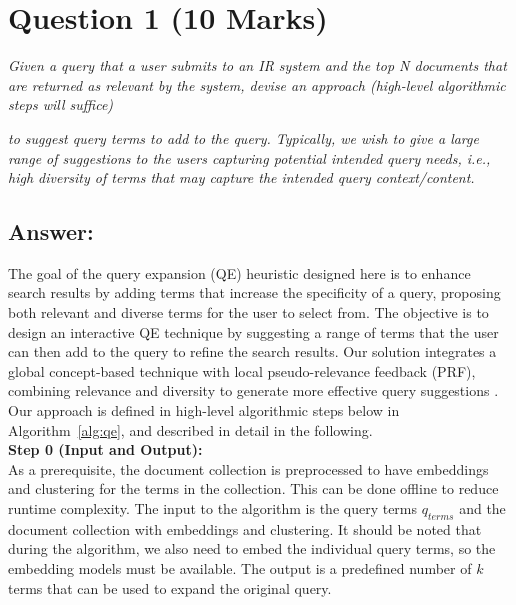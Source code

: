 \setcounter{page}{1}
\pagestyle{fancy}
\fancyhead[L]{\myassignment  \hspace*{1.5mm}- \mycourse} 
\fancyhead[R]{\mydate}


\section{Question 1 (10 Marks)}

\textit{Given a query that a user submits to an IR system and the top N documents that are returned as relevant by the system, devise an approach (high-level algorithmic steps will suffice)}

\textit{to suggest query terms to add to the query. Typically, we wish to give a large range of suggestions to the users capturing potential intended query needs, i.e., high diversity of terms that may capture the intended query context/content.}

\subsection*{Answer:}

The goal of the query expansion (QE) heuristic designed here is to enhance search results by adding terms that increase the specificity of a query, proposing both relevant and diverse terms for the user to select from. The objective is to design an interactive QE technique by suggesting a range of terms that the user can then add to the query to refine the search results.  
Our solution integrates a global concept-based technique with local pseudo-relevance feedback (PRF), combining relevance and diversity to generate more effective query suggestions \cite{azad2019query}. Our approach is defined in high-level algorithmic steps below in Algorithm~\ref{alg:qe}, and described in detail in the following.\\

\textbf{Step 0 (Input and Output):}\\
As a prerequisite, the document collection is preprocessed to have embeddings and clustering for the terms in the collection. This can be done offline to reduce runtime complexity.  
The input to the algorithm is the query terms $q_{terms}$ and the document collection with embeddings and clustering. It should be noted that during the algorithm, we also need to embed the individual query terms, so the embedding models must be available.  
The output is a predefined number of $k$ terms that can be used to expand the original query.\\

